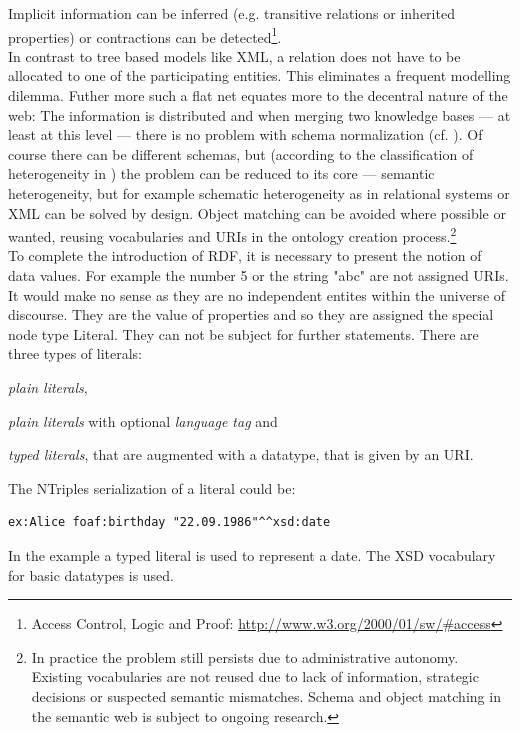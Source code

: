 Implicit information can be inferred (e.g. transitive relations or inherited properties) or contractions can be detected\footnote{Access Control, Logic and Proof: \url{http://www.w3.org/2000/01/sw/#access}}.\\
In contrast to tree based models like XML, a relation does not have to be allocated to one of the participating entities. 
This eliminates a frequent modelling dilemma. 
Futher more such a flat net equates more to the decentral nature of the web: The information is distributed and when merging two knowledge bases --- at least at this level --- there is no problem with schema normalization (cf. \cite{hitzler}). 
Of course there can be different schemas, but (according to the classification of heterogeneity in \cite{ouksel}) the problem can be reduced to its core --- semantic heterogeneity, but for example schematic heterogeneity as in relational systems or XML can be solved by design. 
Object matching can be avoided where possible or wanted, reusing vocabularies and URIs in the ontology creation process.\footnote{In practice the problem still persists due to administrative autonomy. 
Existing vocabularies are not reused due to lack of information, strategic decisions or suspected semantic mismatches. 
Schema and object matching in the semantic web is subject to ongoing research.}\\
To complete the introduction of RDF, it is necessary to present the notion of data values. For example the number 5 or the string "abc" are not assigned URIs. 
It would make no sense as they are no independent entites within the universe of discourse. 
They are the value of properties and so they are assigned the special node type  Literal. 
They can not be subject for further statements. 
There are three types of literals:
\begin{compactitem}
\item \textit{plain literals},
\item \textit{plain literals} with optional \textit{language tag} and 
\item \textit{typed literals}, that are augmented with a datatype, that is given by an URI.
\end{compactitem}
\vspace{0.2ex}
The NTriples serialization of a literal could be:

\begin{lstlisting}[style=N3]
ex:Alice foaf:birthday "22.09.1986"^^xsd:date
\end{lstlisting}
In the example a typed literal is used to represent a date. 
The XSD vocabulary for basic datatypes is used.

